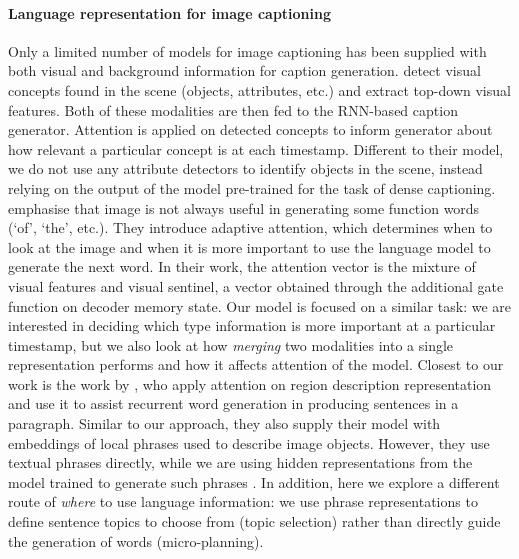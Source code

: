 \documentclass[11pt,a4paper]{article}
\begin{document}
\paragraph{Language representation for image captioning}
Only a limited number of models for image captioning has been supplied with both visual and background information for caption generation.
 detect visual concepts found in the scene (objects, attributes, etc.) and extract top-down visual features.
Both of these modalities are then fed to the RNN-based caption generator.
Attention is applied on detected concepts to inform generator about how relevant a particular concept is at each timestamp.
Different to their model, we do not use any attribute detectors to identify objects in the scene, instead relying on the output of the model pre-trained for the task of dense captioning.
 emphasise that image is not always useful in generating some function words (`of', `the', etc.).
They introduce adaptive attention, which determines when to look at the image and when it is more important to use the language model to generate the next word.
In their work, the attention vector is the mixture of visual features and visual sentinel, a vector obtained through the additional gate function on decoder memory state.
Our model is focused on a similar task: we are interested in deciding which type information is more important at a particular timestamp, but we also look at how \textit{merging} two modalities into a single representation performs and how it affects attention of the model.
Closest to our work is the work by , who apply attention on region description representation and use it to assist recurrent word generation in producing sentences in a paragraph.
Similar to our approach, they also supply their model with embeddings of local phrases used to describe image objects.
However, they use textual phrases directly, while we are using hidden representations from the model trained to generate such phrases \cite{densecap}.
In addition, here we explore a different route of \textit{where} to use language information: we use phrase representations to define sentence topics to choose from (topic selection) rather than directly guide the generation of words (micro-planning).
\end{document}
